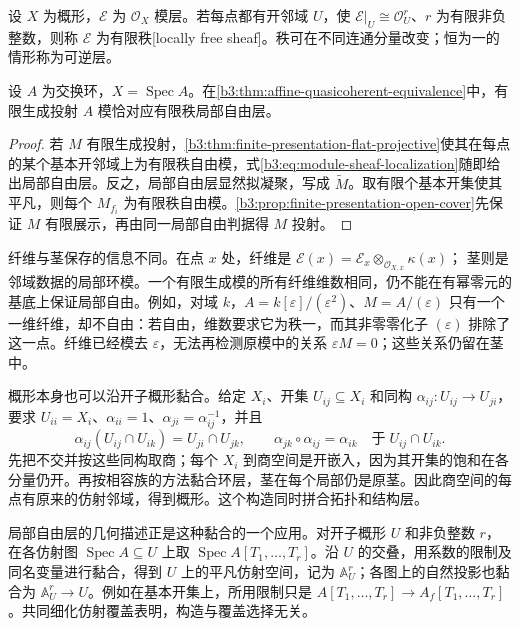 \begin{definition}\label{b3:def:locally-free-sheaf}
	设 \(X\) 为概形，\(\mathcal E\) 为 \(\mathcal O_X\) 模层。若每点都有开邻域 \(U\)，使 \(\mathcal E|_U\cong\mathcal O_U^r\)、\(r\) 为有限非负整数，则称 \(\mathcal E\) 为有限秩[locally free sheaf]。秩可在不同连通分量改变；恒为一的情形称为可逆层。
\end{definition}

\begin{corollary}\label{b3:cor:vector-bundle-projective-module}
	设 \(A\) 为交换环，\(X=\operatorname{Spec}A\)。在\cref{b3:thm:affine-quasicoherent-equivalence}中，有限生成投射 \(A\) 模恰对应有限秩局部自由层。
\end{corollary}
\begin{proof}
	若 \(M\) 有限生成投射，\cref{b3:thm:finite-presentation-flat-projective}使其在每点的某个基本开邻域上为有限秩自由模，式\eqref{b3:eq:module-sheaf-localization}随即给出局部自由层。反之，局部自由层显然拟凝聚，写成 \(\widetilde M\)。取有限个基本开集使其平凡，则每个 \(M_{f_i}\) 为有限秩自由模。\cref{b3:prop:finite-presentation-open-cover}先保证 \(M\) 有限展示，再由同一局部自由判据得 \(M\) 投射。
\end{proof}

纤维与茎保存的信息不同。在点 \(x\) 处，纤维是 \(\mathcal E(x)=\mathcal E_x\otimes_{\mathcal O_{X,x}}\kappa(x)\)； 茎则是邻域数据的局部环模。一个有限生成模的所有纤维维数相同，仍不能在有幂零元的基底上保证局部自由。例如，对域 \(k\)，\(A=k[\varepsilon]/(\varepsilon^2)\)、\(M=A/(\varepsilon)\) 只有一个一维纤维，却不自由：若自由，维数要求它为秩一，而其非零零化子 \((\varepsilon)\) 排除了这一点。纤维已经模去 \(\varepsilon\)，无法再检测原模中的关系 \(\varepsilon M=0\)；这些关系仍留在茎中。

\ProseParagraphBreak
概形本身也可以沿开子概形黏合。给定 \(X_i\)、开集 \(U_{ij}\subseteq X_i\) 和同构 \(\alpha_{ij}:U_{ij}\rightarrow U_{ji}\)，要求 \(U_{ii}=X_i\)、\(\alpha_{ii}=1\)、\(\alpha_{ji}=\alpha_{ij}^{-1}\)，并且
\[
	\alpha_{ij}(U_{ij}\cap U_{ik})=U_{ji}\cap U_{jk},\qquad \alpha_{jk}\circ\alpha_{ij}=\alpha_{ik} \quad\text{于}\;U_{ij}\cap U_{ik}.
\]
先把不交并按这些同构取商；每个 \(X_i\) 到商空间是开嵌入，因为其开集的饱和在各分量仍开。再按相容族的方法黏合环层，茎在每个局部仍是原茎。因此商空间的每点有原来的仿射邻域，得到概形。这个构造同时拼合拓扑和结构层。

\ProseParagraphBreak
局部自由层的几何描述正是这种黏合的一个应用。对开子概形 \(U\) 和非负整数 \(r\)，在各仿射图 \(\operatorname{Spec}A\subseteq U\) 上取 \(\operatorname{Spec}A[T_1,\ldots,T_r]\)。沿 \(U\) 的交叠，用系数的限制及同名变量进行黏合，得到 \(U\) 上的平凡仿射空间，记为 \(\mathbb A_U^r\)；各图上的自然投影也黏合为 \(\mathbb A_U^r\rightarrow U\)。例如在基本开集上，所用限制只是 \(A[T_1,\ldots,T_r]\rightarrow A_f[T_1,\ldots,T_r]\)。共同细化仿射覆盖表明，构造与覆盖选择无关。


